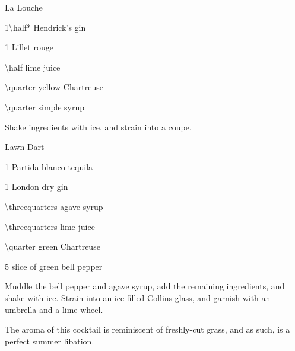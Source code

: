 \begin{Cocktail}[\PDT]{La Louche}
  \begin{Ingredients}
  \item \SI{1\half*}{\oz} Hendrick's gin
  \item \SI{1}{\oz} Lillet rouge
  \item \SI{\half}{\oz} lime juice
  \item \SI{\quarter}{\oz} yellow Chartreuse
  \item \SI{\quarter}{\oz} simple syrup
  \end{Ingredients}
  
  \begin{Instructions}
	Shake ingredients with ice, and strain into a coupe.
  \end{Instructions}
\end{Cocktail}

\begin{Cocktail}[\PDT]{Lawn Dart}
  \begin{Ingredients}\normalsize
  \item \SI{1}{\oz} Partida blanco tequila
  \item \SI{1}{\oz} London dry gin
  \item \SI{\threequarters}{\oz} agave syrup
  \item \SI{\threequarters}{\oz} lime juice
  \item \SI{\quarter}{\oz} green Chartreuse
  \item \SI{5}{\inch} slice of green bell pepper
  \end{Ingredients}
  
  \begin{Instructions}\small
	Muddle the bell pepper and agave syrup, add the remaining ingredients, and shake with ice.  Strain into an ice-filled Collins glass, and garnish with an umbrella and a lime wheel.
	
	The aroma of this cocktail is reminiscent of freshly-cut grass, and as such, is a perfect summer libation.
  \end{Instructions}
\end{Cocktail}

